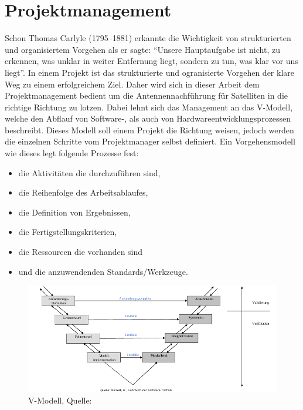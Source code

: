 
\chapter{Projektmanagement}
Schon Thomas Carlyle (1795–1881) erkannte die Wichtigkeit von strukturierten und organisiertem Vorgehen als er sagte:\newpar
``Unsere Hauptaufgabe ist nicht, zu erkennen, was unklar in weiter Entfernung liegt, sondern zu tun, was klar vor uns liegt''.\newpar
In einem Projekt ist das strukturierte und ogranisierte Vorgehen der klare Weg zu einem erfolgreichem Ziel. Daher wird sich in dieser Arbeit
dem Projektmanagement bedient um die Antennennachführung für Satelliten in die richtige Richtung zu lotzen. Dabei lehnt sich das Management an 
das V-Modell, welche den Abflauf von Software-, als auch von Hardwareentwicklungsprozessen beschreibt. Dieses Modell soll einem Projekt 
die Richtung weisen, jedoch werden die einzelnen Schritte vom Projektmanager selbst definiert. Ein Vorgehensmodell wie dieses legt folgende
Prozesse fest:
\begin{itemize}
 \item die Aktivitäten die durchzuführen sind,
 \item die Reihenfolge des Arbeitsablaufes,
 \item die Definition von Ergebnissen,
 \item die Fertigstellungskriterien,
 \item die Ressourcen die vorhanden sind
 \item und die anzuwendenden Standards/Werkzeuge.
\end{itemize}
\begin{figure}[h]
 \centering
 \includegraphics[width=0.8\linewidth]{./images/vmodell}
 \caption{V-Modell, Quelle: \cite{swscript}} %
 \label{fig:vmodell}
\end{figure}
